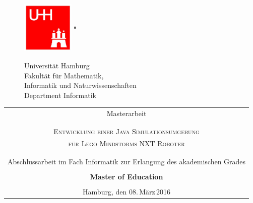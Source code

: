 \begin{titlepage}
\enlargethispage{\baselineskip}
\begin{figure}[htbp]
		\begin{minipage}[b]{25mm}
			\includegraphics[width=25mm,clip]{images/logo_uhh}
		\end{minipage}
		\begin{minipage}[b]{2mm}
			\includegraphics[width=1mm,height=25mm]{images/greypixel}
		\end{minipage}
		\begin{minipage}[b]{10cm}
			{   
				\vspace{2mm}
				{\Large Universität Hamburg } \\
				Fakultät für Mathematik,\\
				Informatik und Naturwissenschaften \\
				Department Informatik \\
			}
		\end{minipage}
	\end{figure}

\vspace{3ex} 
\begin{tabular}{c}
 \huge	Masterarbeit\\
 \\
 \small \\
 \large\textsc{Entwicklung einer Java Simulationsumgebung}\\
\large\textsc{für Lego Mindstorms NXT Roboter}
\\
\\
\\
\small Abschlussarbeit im Fach Informatik zur Erlangung des akademischen Grades\\
\\
\normalsize \textbf{Master of Education}\\
\\
\normalsize Hamburg, den 08.\,März\,2016


\end{tabular}
\end{titlepage}

